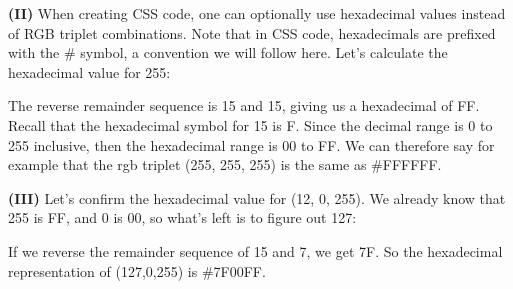 \documentclass[12pt]{article}
\begin{document}
	\hspace{0.45cm}
	\begin{minipage}[t]{.5\linewidth} 
		
		\par\noindent\textbf{(II)} When creating CSS code, one can optionally use hexadecimal values instead of RGB triplet combinations. Note that in CSS code, hexadecimals are prefixed with the \# symbol, a convention we will follow here. Let's calculate the hexadecimal value for 255:
		\begin{flalign*}
			\;\;
		\end{flalign*}
		\par\noindent The reverse remainder sequence is 15 and 15, giving us a hexadecimal of FF. Recall that the hexadecimal symbol for 15 is F. Since the decimal range is 0 to 255 inclusive, then the hexadecimal range is 00 to FF. We can therefore say for example that the rgb triplet (255, 255, 255) is the same as \#FFFFFF.
		\newline
		\par\noindent\textbf{(III)} Let's confirm the hexadecimal value for (12, 0, 255). We already know that 255 is FF, and 0 is 00, so what's left is to figure out 127:
		\begin{flalign*}
			\;\;\intlongdivision{7}{16}
		\end{flalign*}
		\par\noindent If we reverse the remainder sequence of 15 and 7, we get 7F. So the hexadecimal representation of (127,0,255) is \#7F00FF.
	
	\end{minipage}
	
\end{document}
